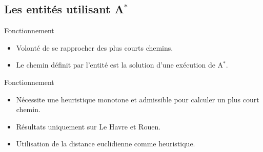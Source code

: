 \documentclass{beamer}
\begin{document}
	\subsection{Les entités utilisant A$^*$}

\begin{frame}
	\begin{block}{Fonctionnement}
		\begin{itemize}
		    \item Volonté de se rapprocher des plus courts chemins.
		    \item Le chemin définit par l'entité est la solution d'une exécution de A$^*$.
		\end{itemize}
	\end{block}
\end{frame}

\begin{frame}
	\begin{block}{Fonctionnement}
		\begin{itemize}
		    \item Nécessite une heuristique monotone et admissible pour calculer un plus court chemin.
		    \item Résultats uniquement sur Le Havre et Rouen.
		    \item Utilisation de la distance euclidienne comme heuristique.
		\end{itemize}
	\end{block}
\end{frame}
\end{document}
